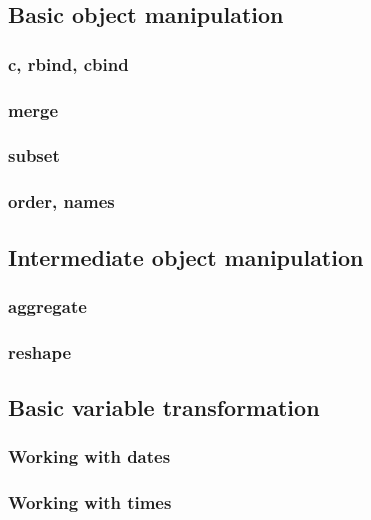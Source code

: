 \documentclass{beamer}
\begin{document}
\subsection{Basic object manipulation}

\begin{frame}[fragile]
    \frametitle{c, rbind, cbind}
    
\end{frame}


\begin{frame}[fragile]
    \frametitle{merge}
    
\end{frame}


\begin{frame}[fragile]
    \frametitle{subset}
    
\end{frame}


\begin{frame}[fragile]
    \frametitle{order, names}
    
\end{frame}


\subsection{Intermediate object manipulation}

\begin{frame}[fragile]
    \frametitle{aggregate}
    
\end{frame}


\begin{frame}[fragile]
    \frametitle{reshape}
    
\end{frame}


\subsection{Basic variable transformation}

\begin{frame}[fragile]
    \frametitle{Working with dates}
    
\end{frame}


\begin{frame}[fragile]
    \frametitle{Working with times}
    
\end{frame}
\end{document}
